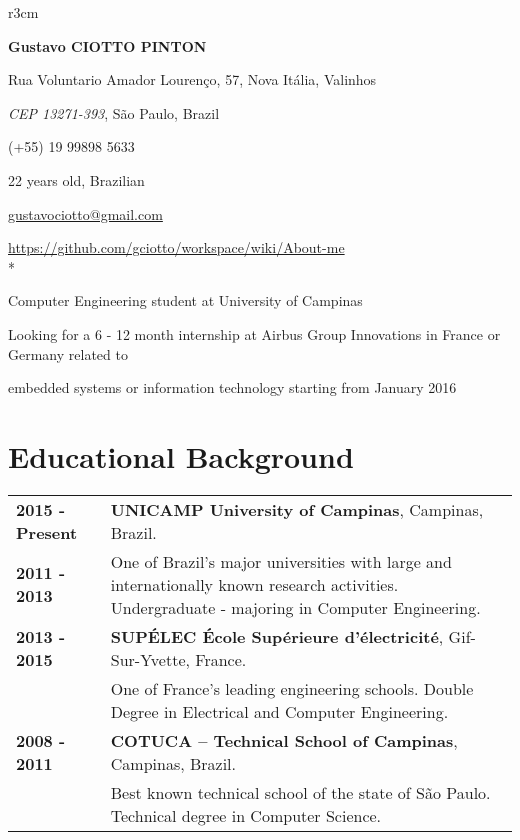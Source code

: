 \documentclass[10pt, a4paper]{article}
\author{Gustavo Ciotto Pinton}
\begin{document}
\pagestyle{empty} 

\begin{wrapfigure}{r}{3cm}
  \vspace{-20pt}
  \begin{center}
  \end{center}
\end{wrapfigure}

\textbf{\LARGE Gustavo CIOTTO PINTON}

Rua Voluntario Amador Lourenço, 57, Nova Itália, Valinhos

\textit{CEP 13271-393}, São Paulo, Brazil

(+55) 19 99898 5633	

22 years old, Brazilian

\url{gustavociotto@gmail.com} 

\url{https://github.com/gciotto/workspace/wiki/About-me}\\*

{\centerline {\large Computer Engineering student at University of Campinas}} 

{\centerline {Looking for a 6 - 12 month internship at Airbus Group
Innovations in France or Germany related to } }

{\centerline {embedded systems or information technology starting from January
2016 } }


\section{Educational Background}

\begin{tabular}{p{} p{}}

 \textbf{2015 - Present} & \textbf{UNICAMP University of
 Campinas}, Campinas, Brazil.
 \\
 \textbf{2011 - 2013} & One of Brazil’s major universities with large and
 internationally known research activities. Undergraduate -  majoring in
 Computer Engineering.
 \\

 \textbf{2013 - 2015} & \textbf{SUPÉLEC  École Supérieure d'électricité},
 Gif-Sur-Yvette, France. \\
 & One of France's leading engineering schools. Double Degree
 in Electrical and Computer Engineering. \\

 
 \textbf{2008 - 2011} & \textbf{COTUCA – Technical School of Campinas},
 Campinas, Brazil. \\
 & Best known technical school of the state of São Paulo. Technical degree in
 Computer Science.  \\
\end{tabular}
\end{document}

